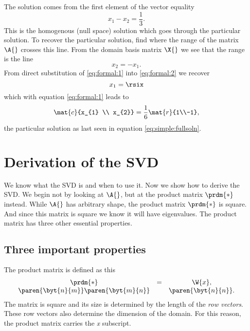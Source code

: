 The solution comes from the first element of the vector equality
\begin{equation}
  x_{1} - x_{2} = \frac{1}{3}.
\label{eq:formal:2}
\end{equation}
This is the homogenous (null space) solution which goes through the particular solution. To recover the particular solution, find where the range of the matrix $\A{}$ crosses this line. From the domain basis matrix $\X{}$ we see that the range is the line
\begin{equation}
x_{2}=-x_{1}.
\label{eq:formal:1}
\end{equation}
From direct substitution of \eqref{eq:formal:1} into \eqref{eq:formal:2} we recover
\begin{equation}
  x_{1} = \rsix
\end{equation}
which with equation \eqref{eq:formal:1} leads to
\begin{equation}
  \mat{c}{x_{1} \\ x_{2}} = \frac{1}{6}\mat{r}{1\\-1},
\end{equation}
the particular solution as last seen in equation \eqref{eq:simple:fullsoln}.

%
%

\section{Derivation of the SVD}

We know what the SVD is and when to use it. Now we show how to derive the SVD. We begin not by looking at $\A{}$, but at the product matrix $\prdm{*}$  instead. While $\A{}$ has arbitrary shape, the product matrix  $\prdm{*}$  is square. And since this matrix is square we know it will have eigenvalues. The product matrix has three other essential properties.


\subsection{Three important properties}
The product matrix is defined as this
\begin{equation}
\begin{array}{ccc}
  \prdm{*} &=& \W{x},\\
  \paren{\byt{n}{m}}\paren{\byt{m}{n}} && \paren{\byt{n}{n}}.
\end{array}
\end{equation}
The matrix is square and its size is determined by the length of the \textit{row vectors}. These row vectors also determine the dimension of the domain. For this reason, the product matrix carries the \textit{x} subscript.

